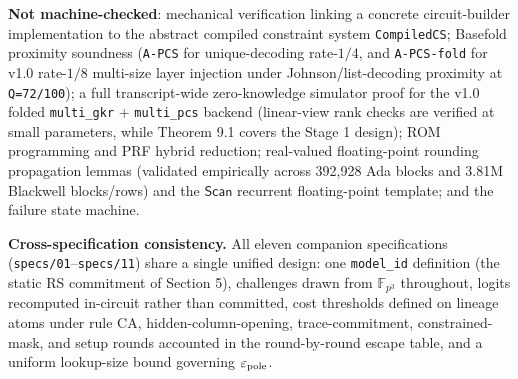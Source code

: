 \documentclass[10pt]{article}
\begin{document}
\textbf{Not machine-checked}: mechanical verification linking a concrete circuit-builder implementation to the abstract compiled constraint system \texttt{CompiledCS}; Basefold proximity soundness (\texttt{A-PCS} for unique-decoding rate-$1/4$, and \texttt{A-PCS-fold} for v1.0 rate-$1/8$ multi-size layer injection under Johnson/list-decoding proximity at \texttt{Q=72/100}); a full transcript-wide zero-knowledge simulator proof for the v1.0 folded \texttt{multi\_\allowbreak{}gkr} + \texttt{multi\_\allowbreak{}pcs} backend (linear-view rank checks are verified at small parameters, while Theorem 9.1 covers the Stage 1 design); ROM programming and PRF hybrid reduction; real-valued floating-point rounding propagation lemmas (validated empirically across 392,928 Ada blocks and 3.81M Blackwell blocks/rows) and the $\mathsf{Scan}$ recurrent floating-point template; and the failure state machine.

\textbf{Cross-specification consistency.} All eleven companion specifications (\texttt{specs/01}--\texttt{specs/11}) share a single unified design: one \texttt{model\_\allowbreak{}id} definition (the static RS commitment of Section 5), challenges drawn from $\mathbb F_{p^3}$ throughout, logits recomputed in-circuit rather than committed, cost thresholds defined on lineage atoms under rule CA, hidden-column-opening, trace-commitment, constrained-mask, and setup rounds accounted in the round-by-round escape table, and a uniform lookup-size bound governing $\varepsilon_{\rm pole}$.
\end{document}

